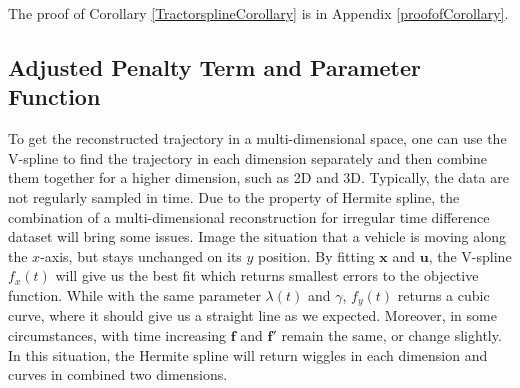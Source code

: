 The proof of Corollary \ref{TractorsplineCorollary} is in Appendix \ref{proofofCorollary}. 





\subsection{Adjusted Penalty Term and Parameter Function}

To get the reconstructed trajectory in a multi-dimensional space, one can use the V-spline to find the trajectory in each dimension separately and then combine them together for a higher dimension, such as 2D and 3D. Typically, the data are not regularly sampled in time. Due to the property of Hermite spline, the combination of a multi-dimensional reconstruction for irregular time difference dataset will bring some issues.  Image the situation that a vehicle is moving along the $x$-axis, but stays unchanged on its $y$ position. By fitting $\mathbf{x}$ and $\mathbf{u}$, the V-spline $f_x(t)$ will give us the best fit which returns smallest errors to the objective function. While with the same parameter $\lambda(t)$ and $\gamma$, $f_y(t)$ returns a cubic curve, where it should give us a straight line as we expected. Moreover, in some circumstances, with time increasing $\mathbf{f}$ and $\mathbf{f}'$ remain the same, or change slightly. In this situation, the Hermite spline will return wiggles in each dimension and curves in combined two dimensions. 

